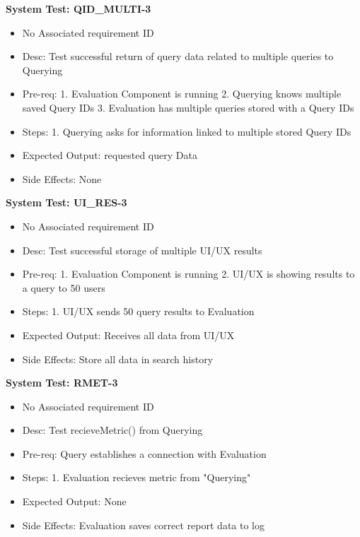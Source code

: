\smallskip

\textbf{System Test: QID\_MULTI-3}
\begin{itemize}
    \item No Associated requirement ID
    \item Desc: Test successful return of query data related to multiple queries to Querying 
    \item Pre-req: 1. Evaluation Component is running 2. Querying knows multiple saved Query IDs 3. Evaluation has multiple queries stored with a Query IDs
    \item Steps: 1. Querying asks for information linked to multiple stored Query IDs
    \item Expected Output: requested query Data
    \item Side Effects: None
\end{itemize}

\smallskip

\textbf{System Test: UI\_RES-3}
\begin{itemize}
    \item No Associated requirement ID
    \item Desc: Test successful storage of multiple UI/UX results
    \item Pre-req: 1. Evaluation Component is running 2. UI/UX is showing results to a query to 50 users
    \item Steps: 1. UI/UX sends 50 query results to Evaluation
    \item Expected Output: Receives all data from UI/UX
    \item Side Effects: Store all data in search history
\end{itemize}

\smallskip

\textbf{System Test: RMET-3}
\begin{itemize}
    \item No Associated requirement ID
    \item Desc: Test recieveMetric() from Querying
    \item Pre-req: Query establishes a connection with Evaluation
    \item Steps: 1. Evaluation recieves metric from "Querying"
    \item Expected Output: None
    \item Side Effects: Evaluation saves correct report data to log
\end{itemize}

\smallskip

